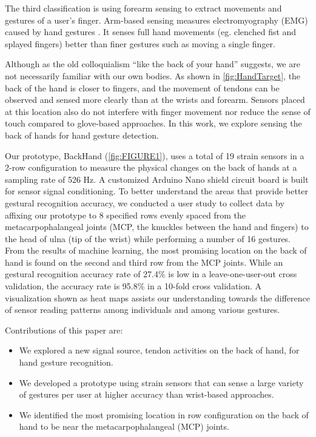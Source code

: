 \documentclass{sigchi}
\begin{document}
The third classification is using forearm sensing to extract movements and gestures of a user's finger. Arm-based sensing measures electromyography (EMG) caused by hand gestures \cite{Myo, Saponas:2009:EAI:1622176.1622208}. It senses full hand movements (eg. clenched fist and splayed fingers) better than finer gestures such as moving a single finger.

Although as the old colloquialism ``like the back of your hand'' suggests, we are not necessarily familiar with our own bodies. As shown in \autoref{fig:HandTarget}, the back of the hand is closer to fingers, and the movement of tendons can be observed and sensed more clearly than at the wrists and forearm. Sensors placed at this location also do not interfere with finger movement nor reduce the sense of touch compared to glove-based approaches. In this work, we explore sensing the back of hands for hand gesture detection.

Our prototype, BackHand (\autoref{fig:FIGURE1}), uses a total of 19 strain sensors in a 2-row configuration to measure the physical changes on the back of hands at a sampling rate of 526 Hz. A customized Arduino Nano shield circuit board is built for sensor signal conditioning. To better understand the areas that provide better gestural recognition accuracy, we conducted a user study to collect data by affixing our prototype to 8 specified rows evenly spaced from the metacarpophalangeal joints (MCP, the knuckles between the hand and fingers) to the head of ulna (tip of the wrist) while performing a number of 16 gestures. From the results of machine learning, the most promising location on the back of hand is found on the second and third row from the MCP joints. While an gestural recognition accuracy rate of 27.4\% is low in a leave-one-user-out cross validation, the accuracy rate is 95.8\% in a 10-fold cross validation. A visualization shown as heat maps assists our understanding towards the difference of sensor reading patterns among individuals and among various gestures.

Contributions of this paper are:
\begin{itemize}
\item We explored a new signal source, tendon activities on the back of hand, for hand gesture recognition.
\item We developed a prototype using strain sensors that can sense a large variety of gestures per user at higher accuracy than wrist-based approaches. 
\item We identified the most promising location in row configuration on the back of hand to be near the metacarpophalangeal (MCP) joints.
\end{itemize}
\end{document}
